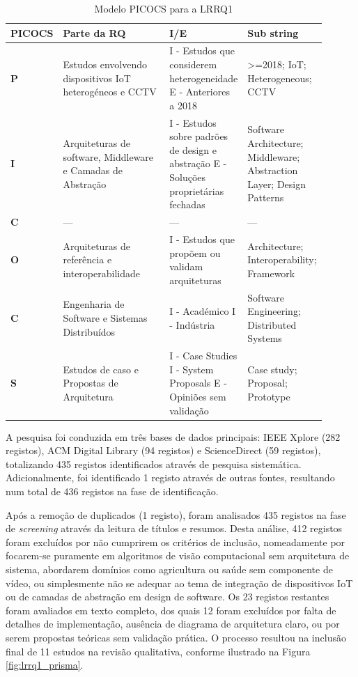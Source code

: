 \begin{table}[H]
	\centering
	\caption{Modelo PICOCS para a LRRQ1}
	\label{tab:lrrq1_picocs}
	\begin{tabular}{p{0.15\linewidth}p{0.35\linewidth}p{0.2\linewidth}p{0.2\linewidth}}
		\toprule
		\textbf{PICOCS} & \textbf{Parte da RQ} & \textbf{I/E} & \textbf{Sub string} \\
		\midrule
		\textbf{P}  & Estudos envolvendo dispositivos IoT heterogéneos e CCTV & I - Estudos que considerem heterogeneidade \newline E - Anteriores a 2018 & >=2018; IoT; Heterogeneous; CCTV \\
		\textbf{I}  & Arquiteturas de software, Middleware e Camadas de Abstração & I - Estudos sobre padrões de design e abstração \newline E - Soluções proprietárias fechadas & Software Architecture; Middleware; Abstraction Layer; Design Patterns \\
		\textbf{C}  & --- & --- & --- \\
		\textbf{O} & Arquiteturas de referência e interoperabilidade & I - Estudos que propõem ou validam arquiteturas & Architecture; Interoperability; Framework \\
		\textbf{C} & Engenharia de Software e Sistemas Distribuídos & I - Académico \newline I - Indústria & Software Engineering; Distributed Systems \\
		\textbf{S}  & Estudos de caso e Propostas de Arquitetura & I - Case Studies \newline I - System Proposals \newline E - Opiniões sem validação & Case study; Proposal; Prototype \\
		\bottomrule
	\end{tabular}
\end{table}



A pesquisa foi conduzida em três bases de dados principais: IEEE Xplore (282 registos), ACM Digital Library (94 registos) e ScienceDirect (59 registos), totalizando 435 registos identificados através de pesquisa sistemática. Adicionalmente, foi identificado 1 registo \cite{resende_sistema_2025} através de outras fontes, resultando num total de 436 registos na fase de identificação.

Após a remoção de duplicados (1 registo), foram analisados 435 registos na fase de \textit{screening} através da leitura de títulos e resumos. Desta análise, 412 registos foram excluídos por não cumprirem os critérios de inclusão, nomeadamente por focarem-se puramente em algoritmos de visão computacional sem arquitetura de sistema, abordarem domínios como agricultura ou saúde sem componente de vídeo, ou simplesmente não se adequar ao tema de integração de dispositivos \gls{IoT} ou de camadas de abstração em design de software. Os 23 registos restantes foram avaliados em texto completo, dos quais 12 foram excluídos por falta de detalhes de implementação, ausência de diagrama de arquitetura claro, ou por serem propostas teóricas sem validação prática. O processo resultou na inclusão final de 11 estudos na revisão qualitativa, conforme ilustrado na Figura \ref{fig:lrrq1_prisma}.

